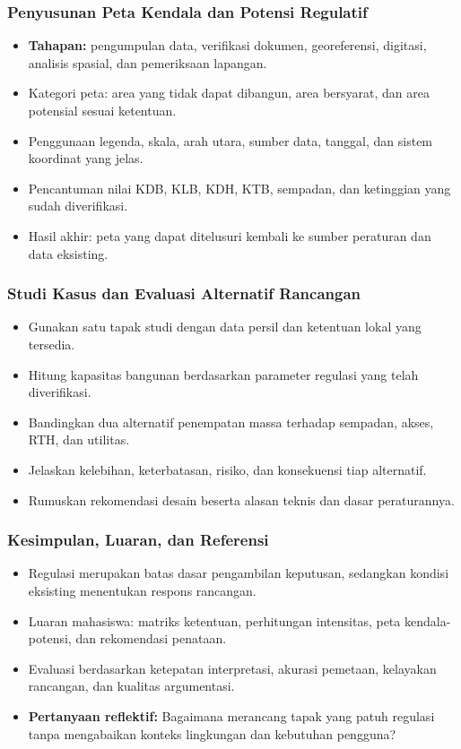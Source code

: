 \documentclass[../main.tex]{subfiles}
\begin{document}
\begin{frame}[mytitle=standard, c, mycolor=white]
	\frametitle{Penyusunan Peta Kendala dan Potensi Regulatif}
	\begin{itemize}
		\item \textbf{Tahapan:} pengumpulan data, verifikasi dokumen, georeferensi, digitasi, analisis spasial, dan pemeriksaan lapangan.
		\item Kategori peta: area yang tidak dapat dibangun, area bersyarat, dan area potensial sesuai ketentuan.
		\item Penggunaan legenda, skala, arah utara, sumber data, tanggal, dan sistem koordinat yang jelas.
		\item Pencantuman nilai KDB, KLB, KDH, KTB, sempadan, dan ketinggian yang sudah diverifikasi.
		\item Hasil akhir: peta yang dapat ditelusuri kembali ke sumber peraturan dan data eksisting.
	\end{itemize}
\end{frame}

\begin{frame}[mytitle=standard, t, mycolor=digiPH_gray]
	\frametitle{Studi Kasus dan Evaluasi Alternatif Rancangan}
	\begin{itemize}
		\item Gunakan satu tapak studi dengan data persil dan ketentuan lokal yang tersedia.
		\item Hitung kapasitas bangunan berdasarkan parameter regulasi yang telah diverifikasi.
		\item Bandingkan dua alternatif penempatan massa terhadap sempadan, akses, RTH, dan utilitas.
		\item Jelaskan kelebihan, keterbatasan, risiko, dan konsekuensi tiap alternatif.
		\item Rumuskan rekomendasi desain beserta alasan teknis dan dasar peraturannya.
	\end{itemize}
\end{frame}

\begin{frame}[mytitle=standard, t, mycolor=white]
	\frametitle{Kesimpulan, Luaran, dan Referensi}
	\begin{itemize}
		\item Regulasi merupakan batas dasar pengambilan keputusan, sedangkan kondisi eksisting menentukan respons rancangan.
		\item Luaran mahasiswa: matriks ketentuan, perhitungan intensitas, peta kendala-potensi, dan rekomendasi penataan.
		\item Evaluasi berdasarkan ketepatan interpretasi, akurasi pemetaan, kelayakan rancangan, dan kualitas argumentasi.
		\item \textbf{Pertanyaan reflektif:} Bagaimana merancang tapak yang patuh regulasi tanpa mengabaikan konteks lingkungan dan kebutuhan pengguna?
	\end{itemize}
\end{frame}
\end{document}
